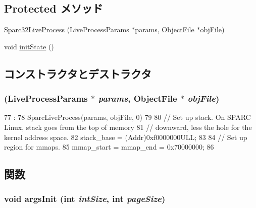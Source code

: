\subsection*{Protected メソッド}
\begin{DoxyCompactItemize}
\item 
\hyperlink{classSparc32LiveProcess_a737cfb32827e9600531934aca30d33ce}{Sparc32LiveProcess} (LiveProcessParams $\ast$params, \hyperlink{classObjectFile}{ObjectFile} $\ast$\hyperlink{classLiveProcess_ab6cfcfa7903c66267b3e0351c3caa809}{objFile})
\item 
void \hyperlink{classSparc32LiveProcess_a3c34ea9b29f410748d4435a667484924}{initState} ()
\end{DoxyCompactItemize}


\subsection{コンストラクタとデストラクタ}
\hypertarget{classSparc32LiveProcess_a737cfb32827e9600531934aca30d33ce}{
\subsubsection[{Sparc32LiveProcess}]{ (LiveProcessParams $\ast$ {\em params}, \/  {\bf ObjectFile} $\ast$ {\em objFile})}}
\label{classSparc32LiveProcess_a737cfb32827e9600531934aca30d33ce}



\begin{DoxyCode}
77                                                                         :
78             SparcLiveProcess(params, objFile, 0)
79     {
80         // Set up stack. On SPARC Linux, stack goes from the top of memory
81         // downward, less the hole for the kernel address space.
82         stack_base = (Addr)0xf0000000ULL;
83 
84         // Set up region for mmaps.
85         mmap_start = mmap_end = 0x70000000;
86     }

\end{DoxyCode}


\subsection{関数}
\hypertarget{classSparc32LiveProcess_a60e5314ffeede1e51c6bcb2cf606ca92}{
\subsubsection[{argsInit}]{\setlength{\rightskip}{0pt plus 5cm}void argsInit (int {\em intSize}, \/  int {\em pageSize})}}
\label{classSparc32LiveProcess_a60e5314ffeede1e51c6bcb2cf606ca92}



